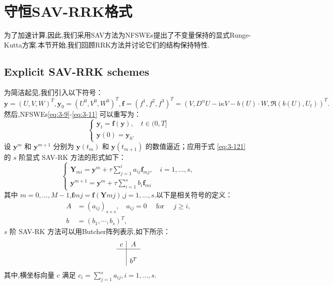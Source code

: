 \section{守恒SAV-RRK格式}\label{Section 4}
为了加速计算,因此,我们采用SAV方法为NFSWEs提出了不变量保持的显式Runge-Kutta方案.本节开始,我们回顾RRK方法并讨论它们的结构保持特性.
\subsection{Explicit SAV-RRK schemes}
为简洁起见,我们引入以下符号：
\begin{equation}
	\bm{y}=\left(U,V,W\right)^T,\bm{y}_0=\left(U^0,V^0,W^0\right)^T , \bm{f}=(f^1,f^2,f^3)^T=(V,D^{\alpha} U-\mathrm{i}\kappa V-b(U)\cdot W,\Re\left(b(U), U_t\right))^T.
\end{equation}
然后,NFSWEs\eqref{eq:3-9}-\eqref{eq:3-11} 可以重写为：
\begin{equation}
	\left\{\begin{array}{l}
	\bm{y}_t=\bm{f}(\bm{y}),\quad t \in(0, T]\\
	\bm{y}(0)=\bm{y}_0.
\end{array}\right.\label{eq:3-121}
\end{equation}
设 $\bm{y}^m$ 和 $\bm{y}^{m+1}$ 分别为 $\bm{y}\left(t_m\right)$ 和 $\bm{y}\left(t_{m+1}\right)$ 的数值逼近；应用于式 \eqref{eq:3-121} 的 $s$ 阶显式 SAV-RK 方法的形式如下：
\begin{equation}
	\left\{\begin{array}{l}
		\bm{Y}_{m i}=\bm{y}^m+\tau \sum\limits_{j=1}^i a_{i j} \bm{f}_{m j}, \quad i=1, \ldots, s, \\
		\bm{y}^{m+1}=\bm{y}^m+\tau \sum\limits_{i=1}^s b_i \bm{f}_{m i}
	\end{array}\right.\label{eq:4-31}
	\end{equation}
    其中 $m=0, \ldots, M-1$,$\bm{f}{m j}=\bm{f}\left(\bm{Y}{m j}\right)$,$j=1, \ldots, s$.以下是相关符号的定义：
\begin{equation}
\begin{aligned}
A & =\left(a_{i j}\right)_{s \times s}, \quad a_{i j}=0 \quad \text { for } \quad j \geq i, \\
b & =\left(b_1, \cdots, b_s\right)^T,
\end{aligned}
\end{equation}
$s$ 阶 SAV-RK 方法可以用Butcher阵列表示,如下所示：
\begin{equation}
	\begin{array}{c|c}
	c & A \\
	\hline \\
	& b^T
	\end{array}
	\end{equation}
    其中,横坐标向量 $c$ 满足 $c_i=\sum\limits_{j=1}^s a_{i j}, i=1, \ldots, s$.

